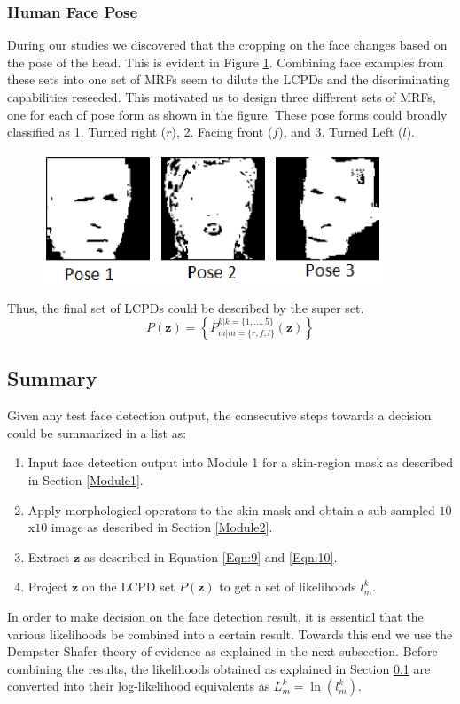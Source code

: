 \documentclass[times, 10pt,twocolumn]{article}
\begin{document}
\subsubsection{Human Face Pose}\label{HumanFacePose}During our studies we discovered that
the cropping on the face changes based on the pose of the head. This
is evident in Figure \ref{Fig:PoseMasks}. Combining face examples
from these sets into one set of MRFs seem to dilute the LCPDs and
the discriminating capabilities reseeded. This motivated us to
design three different sets of MRFs, one for each of pose form as
shown in the figure. These pose forms could broadly classified as 1.
Turned right ($r$), 2. Facing front ($f$), and 3. Turned Left ($l$).
\begin{figure}[h]
\hspace{-0.3in}\includegraphics[width=4in]{Figure10.eps}
\caption{{\bf {\selectfont }}} \label{Fig:PoseMasks}
\end{figure}
Thus, the final set of LCPDs could be described by the super set.
\begin{equation}
P(\mathbf z) = \left\{P^{k|k=\{1,\ldots,5\}}_{m|m=\{r,f,l\}}(\mathbf
z) \right\}
\end{equation}
\subsection{Summary}\label{Summary}
Given any test face detection output, the consecutive steps towards
a decision could be summarized in a list as:
\begin{enumerate}
\item Input face detection output into Module 1 for a skin-region
mask as described in Section \ref{Module1}.
\item Apply morphological operators to the skin mask and obtain a sub-sampled
$10$x$10$ image as described in Section \ref{Module2}.
\item Extract $\mathbf{z}$ as described in Equation \ref{Eqn:9} and \ref{Eqn:10}.
\item Project $\mathbf{z}$ on the LCPD set $P(\mathbf z)$ to get a
set of likelihoods $l_m^k$.
\end{enumerate}
In order to make decision on the face detection result, it is
essential that the various likelihoods be combined into a certain
result. Towards this end we use the Dempster-Shafer theory of
evidence as explained in the next subsection. Before combining the
results, the likelihoods obtained as explained in Section
\ref{Summary} are converted into their log-likelihood equivalents as
$L_m^k = \ln \left(l_m^k\right)$.
\end{document}
